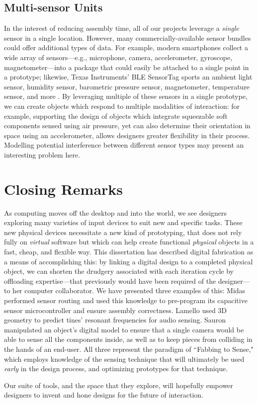 \subsection{Multi-sensor Units}

In the interest of reducing assembly time, all of our projects leverage a \emph{single} sensor in a single location. However, many commercially-available sensor bundles could offer additional types of data. For example, modern smartphones collect a wide array of sensors---e.g., microphone, camera, accelerometer, gyroscope, magnetometer---into a package that could easily be attached to a single point in a prototype; likewise, Texas Instruments' BLE SensorTag sports an ambient light sensor, humidity sensor, barometric pressure sensor, magnetometer, temperature sensor, and more \cite{ti-sensortag}. By leveraging multiple of these sensors in a single prototype, we can create objects which respond to multiple modalities of interaction: for example, supporting the design of objects which integrate squeezable soft components sensed using air pressure, yet can also determine their orientation in space using an accelerometer, allows designers greater flexibility in their process. Modelling potential interference between different sensor types may present an interesting problem here.

\section{Closing Remarks}

As computing moves off the desktop and into the world, we see designers exploring many varieties of input devices to suit new and specific tasks. These new physical devices necessitate a new kind of prototyping, that does not rely fully on \emph{virtual} software but which can help create functional \emph{physical} objects in a fast, cheap, and flexible way. This dissertation has described digital fabrication as a means of accomplishing this: by linking a digital design to a completed physical object, we can shorten the drudgery associated with each iteration cycle by offloading expertise---that previously would have been required of the designer---to her computer collaborator. We have presented three examples of this: Midas performed sensor routing and used this knowledge to pre-program its capacitive sensor microcontroller and ensure assembly correctness. Lamello used 3D geometry to predict tines' resonant frequencies for audio sensing. Sauron manipulated an object's digital model to ensure that a single camera would be able to sense all the components inside, as well as to keep pieces from colliding in the hands of an end-user. All three represent the paradigm of ``Fabbing to Sense," which employs knowledge of the sensing technique that will ultimately be used \emph{early} in the design process, and optimizing prototypes for that technique.

Our suite of tools, and the space that they explore, will hopefully empower designers to invent and hone designs for the future of interaction.
